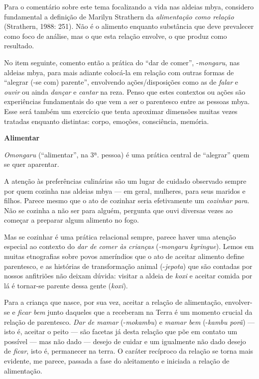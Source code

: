 Para o comentário sobre este tema focalizando a vida nas aldeias mbya,
considero fundamental a definição de Marilyn Strathern da
\emph{alimentação como relação} (Strathern, 1988: 251). Não é o alimento
enquanto substância que deve prevalecer como foco de análise, mas o que
esta relação envolve, o que produz como resultado.

No item seguinte, comento então a prática do ``dar de comer'',
-\emph{mongaru}, nas aldeias mbya, para mais adiante colocá-la em
relação com outras formas de ``alegrar (-se com) parente'', envolvendo
ações/disposições como as de \emph{falar} e \emph{ouvir} ou ainda
\emph{dançar} e \emph{cantar} na reza. Penso que estes contextos ou
ações são experiências fundamentais do que vem a ser o parentesco entre
as pessoas mbya. Esse será também um exercício que tenta aproximar
dimensões muitas vezes tratadas enquanto distintas: corpo, emoções,
consciência, memória.

\textbf{Alimentar}

\emph{Omongaru} (``alimentar'', na 3ª. pessoa) é uma prática central de
``alegrar'' quem se quer aparentar.

A atenção às preferências culinárias são um lugar de cuidado observado
sempre por quem cozinha nas aldeias mbya --- em geral, mulheres, para
seus maridos e filhos. Parece mesmo que o ato de cozinhar seria
efetivamente um \emph{cozinhar} \emph{para}. Não se cozinha a não ser
para alguém, pergunta que ouvi diversas vezes ao começar a preparar
algum alimento no fogo.

Mas se cozinhar é uma prática relacional sempre, parece haver uma
atenção especial ao contexto do \emph{dar de comer às crianças}
(\emph{-mongaru kyringue}). Lemos em muitas etnografias sobre povos
ameríndios que o ato de aceitar alimento define parentesco, e as
histórias de transformação animal (-\emph{jepota}) que são contadas por
nossos anfitriões não deixam dúvida: visitar a aldeia de \emph{koxi} e
aceitar comida por lá é tornar-se parente dessa gente (\emph{koxi}).

Para a criança que nasce, por sua vez, aceitar a relação de alimentação,
envolver-se e \emph{ficar bem} junto daqueles que a receberam na Terra é
um momento crucial da relação de parentesco. \emph{Dar de mamar}
(-\emph{mokambu}) e \emph{mamar bem} (-\emph{kambu porã}) --- isto é,
aceitar o peito --- são facetas já desta relação que põe em contato um
possível --- mas não dado --- desejo de cuidar e um igualmente não dado
desejo de \emph{ficar}, isto é, permanecer na terra. O caráter recíproco
da relação se torna mais evidente, me parece, passada a fase do
aleitamento e iniciada a relação de alimentação.

